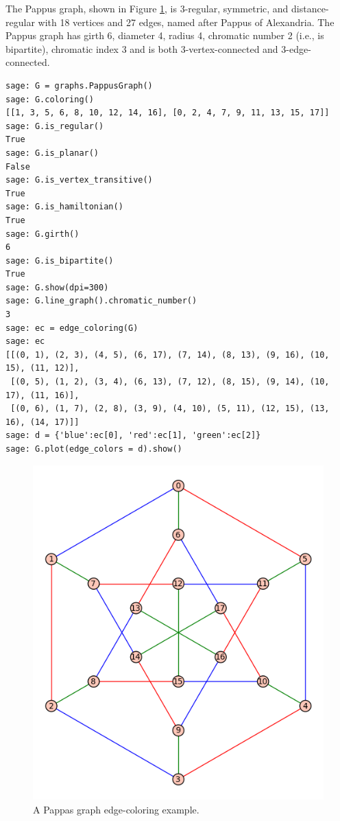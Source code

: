 \begin{example}
\label{eg:graph_coloring:pappas_graph_edge_coloring_example}
The Pappus graph, shown in Figure
\ref{fig:graph-coloring:pappas-graph-edge-coloring-example},
 is $3$-regular, symmetric, and distance-regular with 18 vertices and
27 edges, named after Pappus of Alexandria.
The Pappus graph has girth 6, diameter 4, radius 4, chromatic number
2 (i.e., is bipartite),
chromatic index 3 and is both 3-vertex-connected and 3-edge-connected.
\end{example}

\begin{lstlisting}
sage: G = graphs.PappusGraph()
sage: G.coloring()
[[1, 3, 5, 6, 8, 10, 12, 14, 16], [0, 2, 4, 7, 9, 11, 13, 15, 17]]
sage: G.is_regular()
True
sage: G.is_planar()
False
sage: G.is_vertex_transitive()
True
sage: G.is_hamiltonian()
True
sage: G.girth()
6
sage: G.is_bipartite()
True
sage: G.show(dpi=300)
sage: G.line_graph().chromatic_number()
3
sage: ec = edge_coloring(G)
sage: ec
[[(0, 1), (2, 3), (4, 5), (6, 17), (7, 14), (8, 13), (9, 16), (10, 15), (11, 12)],
 [(0, 5), (1, 2), (3, 4), (6, 13), (7, 12), (8, 15), (9, 14), (10, 17), (11, 16)],
 [(0, 6), (1, 7), (2, 8), (3, 9), (4, 10), (5, 11), (12, 15), (13, 16), (14, 17)]]
sage: d = {'blue':ec[0], 'red':ec[1], 'green':ec[2]}
sage: G.plot(edge_colors = d).show()
\end{lstlisting}

\begin{figure}[!htbp]
\centering
{}
\includegraphics[scale=0.7]{image/graph-coloring/pappas-graph-edge-coloring-example}
\caption{A Pappas graph edge-coloring example.}
\label{fig:graph-coloring:pappas-graph-edge-coloring-example}
\end{figure}

